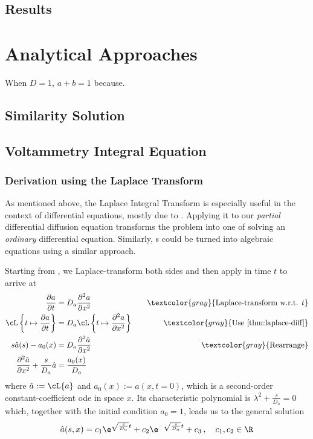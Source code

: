 \documentclass{prettytex/ox/mmsc-special-topic}
\begin{document}
  \subsection{Results}

  \section{Analytical Approaches}
  When $D = 1$, $a + b = 1$ because.

  \subsection{Similarity Solution}
  \subsection{Voltammetry Integral Equation}
  \subsubsection{Derivation using the Laplace Transform}
  As mentioned above, the Laplace Integral Transform is especially useful in the context of differential equations, mostly due to .
  Applying it to our \textit{partial} differential diffusion equation  transforms the problem into one of solving an \textit{ordinary} differential equation.
  Similarly, s could be turned into algebraic equations using a similar approach.

  Starting from , we Laplace-transform both sides and then apply  in time $t$ to arrive at
  \begin{align*}
    \frac{\partial a}{\partial t}                                   & = D_a \frac{\partial^2 a}{\partial x^2} \quad                             & \textcolor{gray}{\text{Laplace-transform w.r.t. } t} \\
    \cL\left\{t \mapsto \frac{\partial a}{\partial t}\right\}       & = D_a \cL\left\{t \mapsto \frac{\partial^2 a}{\partial x^2}\right\} \quad & \textcolor{gray}{\text{Use \Cref{thm:laplace-diff}}} \\
    s \hat{a}(s) - a_0(x)                                           & = D_a \frac{\partial^2 \hat{a}}{\partial x^2} \quad                       & \textcolor{gray}{\text{Rearrange}}                   \\
    \frac{\partial^2 \hat{a}}{\partial x^2} + \frac{s}{D_a} \hat{a} & = \frac{a_0(x)}{D_a}
  \end{align*}
  where $\hat{a} := \cL\{a\}$ and $a_0(x) := a(x, t=0)$, which is a second-order constant-coefficient \glsdesc{ode} in space $x$. Its characteristic polynomial is $\lambda^2 + \frac{s}{D_a} = 0$ which, together with the initial condition $a_0 = 1$, leads us to the general solution
  \begin{equation}
    \hat{a}(s, x) = c_1 \e^{\sqrt{\frac{s}{D_a}}t} + c_2 \e^{-\sqrt{\frac{s}{D_a}}t} + c_3\,,\quad c_1, c_2 \in \R
    \label{eq:laplace-solution}
  \end{equation}
\end{document}
